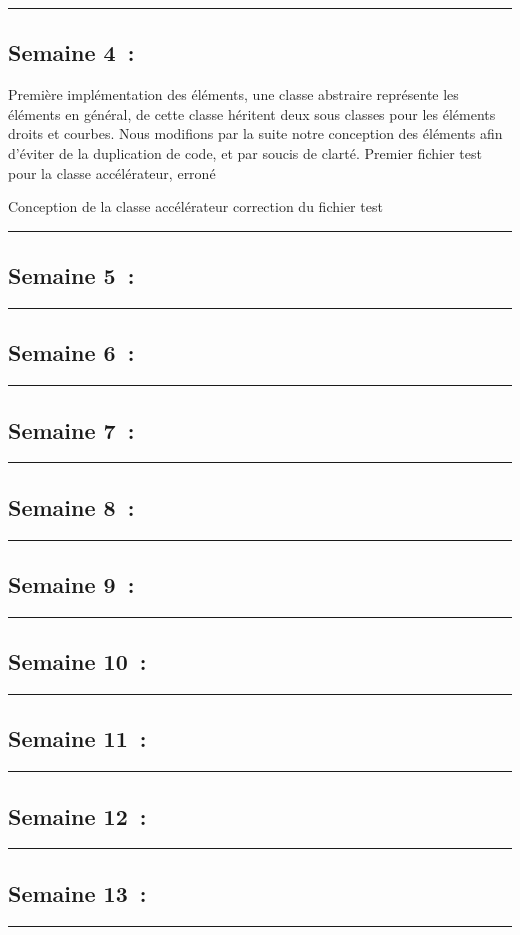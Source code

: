\documentclass[12pt, letterpaper, twoside]{article}
\begin{document}
\rule{\textwidth}{0.4pt}

\subsection{Semaine 4 :}

Première implémentation des éléments, une classe abstraire représente les éléments en général, de cette classe héritent deux sous classes pour les éléments droits et courbes.
Nous modifions par la suite notre conception des éléments afin d'éviter de la duplication de code, et par soucis de clarté. Premier fichier test pour la classe accélérateur, erroné

Conception de la classe accélérateur correction du fichier test

\rule{\textwidth}{0.4pt}

\subsection{Semaine 5 :}

\rule{\textwidth}{0.4pt}

\subsection{Semaine 6 :}

\rule{\textwidth}{0.4pt}

\subsection{Semaine 7 :}

\rule{\textwidth}{0.4pt}

\subsection{Semaine 8 :}

\rule{\textwidth}{0.4pt}

\subsection{Semaine 9 :}

\rule{\textwidth}{0.4pt}

\subsection{Semaine 10 :}

\rule{\textwidth}{0.4pt}

\subsection{Semaine 11 :}

\rule{\textwidth}{0.4pt}

\subsection{Semaine 12 :}

\rule{\textwidth}{0.4pt}

\subsection{Semaine 13 :}

\rule{\textwidth}{0.4pt}
\end{document}
